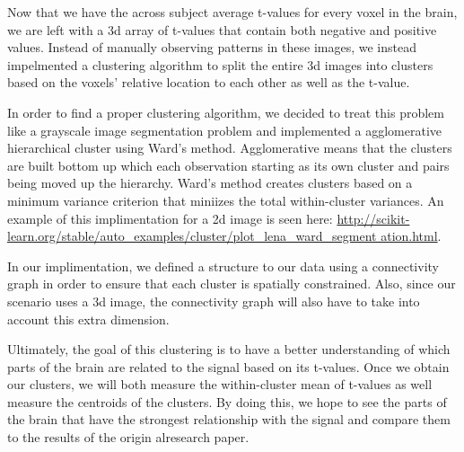 \par Now that we have the across subject average t-values for every voxel in
the brain, we are left with a 3d array of t-values that contain both negative
and positive values. Instead of manually observing patterns in these images, we
instead impelmented a clustering algorithm to split the entire 3d images into
clusters based on the voxels' relative location to each other as well as the
t-value.

\par In order to find a proper clustering algorithm, we decided to treat this
problem like a grayscale image segmentation problem and implemented a
agglomerative hierarchical cluster using Ward's method. Agglomerative means
that the clusters are built bottom up which each observation starting as its
own cluster and pairs being moved up the hierarchy. Ward's method creates
clusters based on a minimum variance criterion that miniizes the total
within-cluster variances. An example of this implimentation for a 2d image is
seen here: 
\url{http://scikit-learn.org/stable/auto_examples/cluster/plot_lena_ward_segment
 ation.html}.

In our implimentation, we defined a structure to our data using a connectivity
graph in order to ensure that each cluster is spatially constrained. Also,
since our scenario uses a 3d image, the connectivity graph will also have to
take into account this extra dimension.

\par Ultimately, the goal of this clustering is to have a better understanding
of which parts of the brain are related to the signal based on its t-values.
Once we obtain our clusters, we will both measure the within-cluster mean of
t-values as well measure the centroids of the clusters. By doing this, we hope
to see the parts of the brain that have the strongest relationship with the
signal and compare them to the results of the origin alresearch paper.



